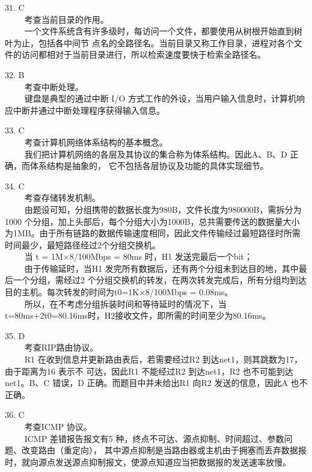 31. C \\
$\qquad$ 考查当前目录的作用。\\
$\qquad$ 一个文件系统含有许多级时，每访问一个文件，都要使用从树根开始直到树叶为止，包括各中间节
点名的全路径名。当前目录又称工作目录，进程对各个文件的访问都相对于当前目录进行，所以检索速度要快于检索全路径名。

32. B \\
$\qquad$ 考查中断处理。\\
$\qquad$ 键盘是典型的通过中断 I/O 方式工作的外设，当用户输入信息时，计算机响应中断并通过中断处理程序获得输入信息。

33. C \\
$\qquad$ 考查计算机网络体系结构的基本概念。\\
$\qquad$ 我们把计算机网络的各层及其协议的集合称为体系结构。因此A、B、D 正确，而体系结构是抽象的，
它不包括各层协议及功能的具体实现细节。

34. C \\
$\qquad$ 考查存储转发机制。\\
$\qquad$ 由题设可知，分组携带的数据长度为980B，文件长度为980000B，需拆分为1000 个分组，加上头部后，每个分组大小为1000B，总共需要传送的数据量大小为1MB。由于所有链路的数据传输速度相同，因此文件传输经过最短路径时所需时间最少，最短路径经过2个分组交换机。\\
$\qquad$ 当 t = 1M×8/100Mbps = 80ms 时，H1 发送完最后一个bit；\\
$\qquad$ 由于传输延时，当H1 发完所有数据后，还有两个分组未到达目的地，其中最后一个分组，需经过2
个分组交换机的转发，在两次转发完成后，所有分组均到达目的主机。每次转发的时间为t0=1K×8/100Mbps = 0.08ms。\\
$\qquad$ 所以，在不考虑分组拆装时间和等待延时的情况下，当 t=80ms+2t0=80.16ms时，H2接收文件，即所需的时间至少为80.16ms。

35. D \\
$\qquad$ 考查RIP路由协议。\\
$\qquad$ R1 在收到信息并更新路由表后，若需要经过R2 到达net1，则其跳数为17，由于距离为16 表示不
可达，因此R1 不能经过R2 到达net1，R2 也不可能到达net1。B、C 错误，D 正确。而题目中并未给出R1 向R2 发送的信息，因此A 也不正确。

36. C \\
$\qquad$ 考查ICMP 协议。\\
$\qquad$ ICMP 差错报告报文有5 种，终点不可达、源点抑制、时间超过、参数问题、改变路由（重定向），
其中源点抑制是当路由器或主机由于拥塞而丢弃数据报时，就向源点发送源点抑制报文，使源点知道应当把数据报的发送速率放慢。

